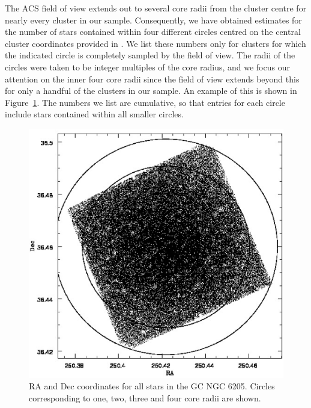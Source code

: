 The ACS field of view extends out to several core radii from the
cluster centre for nearly every cluster in our sample.  Consequently,
we have obtained estimates for the number 
of stars contained within four different circles centred on the central
cluster coordinates provided in \citet{goldsbury10}.  We list
these numbers only for clusters for which the indicated circle is
completely sampled by the field of view.  
The radii of the circles were taken to be integer multiples of the
core radius, and we focus our attention on the inner four core radii
since the field of view extends beyond this for only a handful of the
clusters in our sample.  An example
of this is shown in Figure~\ref{fig:fig2}.  The numbers we
list are cumulative, so that entries for each circle include
stars contained within all smaller circles.  

\begin{figure} [!h]
  \begin{center}
 \includegraphics[scale=0.5]{Chapter-4/fig2.eps}
\caption[Plot showing the RA and Dec coordinates for all stars in NGC
6205]{RA and Dec coordinates for all stars in the GC NGC 6205.
  Circles corresponding to one, two, three and four core radii are 
  shown.  
\label{fig:fig2}}
\end{center}
\end{figure}

